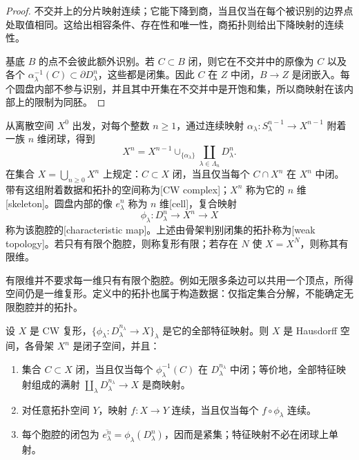 \begin{proof}
	不交并上的分片映射连续；它能下降到商，当且仅当在每个被识别的边界点处取值相同。这给出相容条件、存在性和唯一性，商拓扑则给出下降映射的连续性。

	基底 \(B\) 的点不会彼此额外识别。若 \(C\subset B\) 闭，则它在不交并中的原像为 \(C\) 以及各个 \(\alpha_\lambda^{-1}(C)\subset\partial D^n_\lambda\)，这些都是闭集。因此 \(C\) 在 \(Z\) 中闭，\(B\to Z\) 是闭嵌入。每个圆盘内部不参与识别，并且其中开集在不交并中是开饱和集，所以商映射在该内部上的限制为同胚。
\end{proof}

\begin{definition}[CW 复形]
	\label{g2:def:cw-complex}
	从离散空间 \(X^0\) 出发，对每个整数 \(n\geq1\)，通过连续映射 \(\alpha_\lambda:S^{n-1}_\lambda\to X^{n-1}\) 附着一族 \(n\) 维闭球，得到
	\[
		X^n=X^{n-1}\cup_{\{\alpha_\lambda\}}\coprod_{\lambda\in\Lambda_n}D^n_\lambda.
	\]
	在集合 \(X=\bigcup_{n\geq0}X^n\) 上规定：\(C\subset X\) 闭，当且仅当每个 \(C\cap X^n\) 在 \(X^n\) 中闭。带有这组附着数据和拓扑的空间称为[CW complex]；\(X^n\) 称为它的 \(n\) 维[skeleton]。圆盘内部的像 \(e^n_\lambda\) 称为 \(n\) 维[cell]，复合映射
	\[
		\phi_\lambda:D^n_\lambda\longrightarrow X^n\longrightarrow X
	\]
	称为该胞腔的[characteristic map]。上述由骨架判别闭集的拓扑称为[weak topology]。若只有有限个胞腔，则称复形有限；若存在 \(N\) 使 \(X=X^N\)，则称其有限维。
\end{definition}

有限维并不要求每一维只有有限个胞腔。例如无限多条边可以共用一个顶点，所得空间仍是一维复形。定义中的拓扑也属于构造数据：仅指定集合分解，不能确定无限胞腔并的拓扑。

\begin{proposition}
	\label{g2:prop:cw-weak-topology}
	设 \(X\) 是 CW 复形，\(\{\phi_\lambda:D^{n_\lambda}_\lambda\to X\}_\lambda\) 是它的全部特征映射。则 \(X\) 是 Hausdorff 空间，各骨架 \(X^n\) 是闭子空间，并且：
	\begin{enumerate}
		\item 集合 \(C\subset X\) 闭，当且仅当每个 \(\phi_\lambda^{-1}(C)\) 在 \(D^{n_\lambda}_\lambda\) 中闭；等价地，全部特征映射组成的满射 \(\coprod_\lambda D^{n_\lambda}_\lambda\to X\) 是商映射。
		\item 对任意拓扑空间 \(Y\)，映射 \(f:X\to Y\) 连续，当且仅当每个 \(f\circ\phi_\lambda\) 连续。
		\item 每个胞腔的闭包为 \(\overline{e^n_\lambda}=\phi_\lambda(D^n_\lambda)\)，因而是紧集；特征映射不必在闭球上单射。
	\end{enumerate}
\end{proposition}

